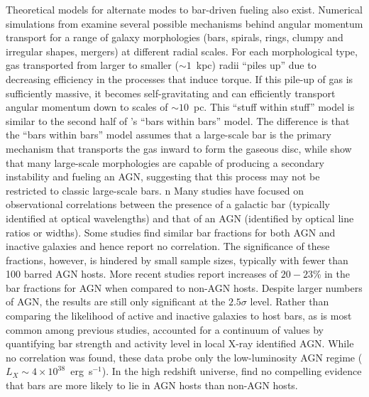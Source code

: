 Theoretical models for alternate modes to bar-driven fueling also exist. Numerical simulations from \citet{Hopkins2010} examine several possible mechanisms behind angular momentum transport for a range of galaxy morphologies (bars, spirals, rings, clumpy and irregular shapes, mergers) at different radial scales. For each morphological type, gas transported from larger to smaller ($\sim1$~kpc) radii ``piles up'' due to decreasing efficiency in the processes that induce torque. If this pile-up of gas is sufficiently massive, it becomes self-gravitating and can efficiently transport angular momentum down to scales of $\sim10$~pc. This ``stuff within stuff'' model is similar to the second half of \citet{Shlosman1989}'s ``bars within bars'' model. The difference is that the ``bars within bars'' model assumes that a large-scale bar is the primary mechanism that transports the gas inward to form the gaseous disc, while \citet{Hopkins2010} show that many large-scale morphologies are capable of producing a secondary instability and fueling an AGN, suggesting that this process may not be restricted to classic large-scale bars. 
n
Many studies have focused on observational correlations between the presence of a galactic bar (typically identified at optical wavelengths) and that of an AGN (identified by optical line ratios or widths). Some studies \citep[eg,][]{Ho1997,Mulchaey1997,Hunt1999} find similar bar fractions for both AGN and inactive galaxies and hence report no correlation. The significance of these fractions, however, is hindered by small sample sizes, typically with fewer than 100 barred AGN hosts. More recent studies \citep{Knapen2000,Laine2002,Laurikainen2004} report increases of $20-23$\% in the bar fractions for AGN when compared to non-AGN hosts. Despite larger numbers of AGN, the results are still only significant at the $2.5\sigma$ level. Rather than comparing the likelihood of active and inactive galaxies to host bars, as is most common among previous studies, \citet{Cisternas2013} accounted for a continuum of values by quantifying bar strength and activity level in local X-ray identified AGN. While no correlation was found, these data probe only the low-luminosity AGN regime ($L_X\sim4\times10^{38}$~erg~s$^{-1}$). In the high redshift universe, \citet{Cheung2015} find no compelling evidence that bars are more likely to lie in AGN hosts than non-AGN hosts. 

